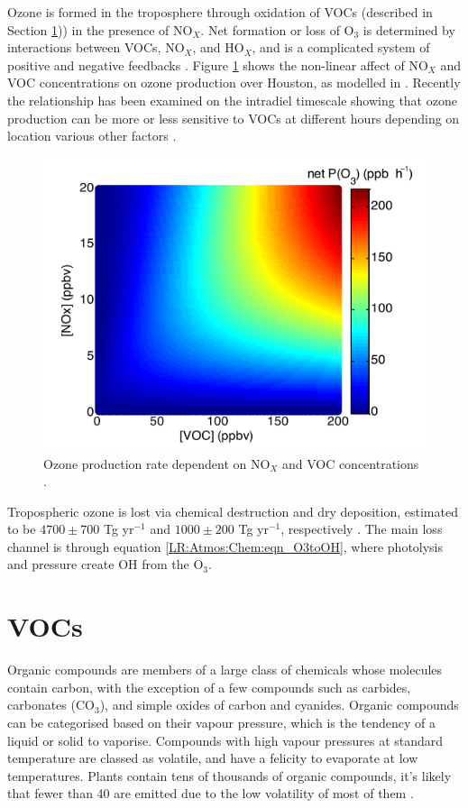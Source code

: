     Ozone is formed in the troposphere through oxidation of VOCs (described in Section \ref{LR:VOCs})) in the presence of NO$_X$.
    Net formation or loss of O$_3$ is determined by interactions between VOCs, NO$_X$, and HO$_X$, and is a complicated system of positive and negative feedbacks \citep{Atkinson2000}.
    Figure \ref{LR:VOCs:fig_NOXVOCOzone} shows the non-linear affect of NO$_X$ and VOC concentrations on ozone production over Houston, as modelled in \cite{Mazzuca2016}.
    Recently the relationship has been examined on the intradiel timescale showing that ozone production can be more or less sensitive to VOCs at different hours depending on location various other factors \citep{Mazzuca2016}.
    
    \begin{figure}
      \includegraphics[width=.75\textwidth]{Figures/Mazzuca2016_NOxVOCOzone.png}
      \caption{Ozone production rate dependent on NO$_X$ and VOC concentrations \citep{Mazzuca2016}.}
      \label{LR:VOCs:fig_NOXVOCOzone}
    \end{figure}
    
    
    Tropospheric ozone is lost via chemical destruction and dry deposition, estimated to be $4700\pm700$ Tg yr$^{-1}$ and $1000\pm200$ Tg yr$^{-1}$, respectively \citep{Stevenson2006,Young2018}.
    The main loss channel is through equation \ref{LR:Atmos:Chem:eqn_O3toOH}, where photolysis and pressure create OH from the O$_3$.
    

\section{VOCs}
\label{LR:VOCs}
  Organic compounds are members of a large class of chemicals whose molecules contain carbon, with the exception of a few compounds such as carbides, carbonates (CO$_3$), and simple oxides of carbon and cyanides.
  Organic compounds can be categorised based on their vapour pressure, which is the tendency of a liquid or solid to vaporise.
  Compounds with high vapour pressures at standard temperature are classed as volatile, and have a felicity to evaporate at low temperatures.
  Plants contain tens of thousands of organic compounds, it's likely that fewer than 40 are emitted due to the low volatility of most of them \citep{Guenther2000}.
  
